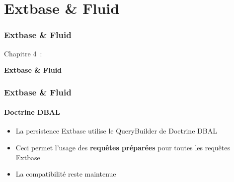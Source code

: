 %

\section{Extbase \& Fluid}
\begin{frame}[fragile]
	\frametitle{Extbase \& Fluid}

	\begin{center}\huge{Chapitre 4~:}\end{center}
	\begin{center}\huge{\color{typo3darkgrey}\textbf{Extbase \& Fluid}}\end{center}

\end{frame}


\begin{frame}[fragile]
	\frametitle{Extbase \& Fluid}
	\framesubtitle{Doctrine DBAL}

	\begin{itemize}

		\item La persistence Extbase utilise le QueryBuilder de Doctrine DBAL
		\item Ceci permet l'usage des \textbf{requêtes préparées} pour toutes les requêtes Extbase
		\item La compatibilité reste maintenue

	\end{itemize}

\end{frame}


